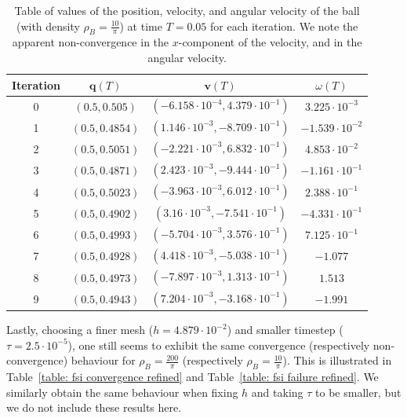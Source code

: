 \documentclass[a4paper]{amsart}
\numberwithin{equation}{section}
\theoremstyle{plain}
\newcommand{\mbf}[1]{\mathbf{#1}}
\begin{document}
\begin{table}[ht]
    \centering
    \begin{tabular}{|c|c|c|c|}
    \hline
        Iteration & $\mbf{q}(T)$ & $\mbf{v}(T)$ & $\omega(T)$\\
        \hline
        0 & $(0.5,0.505)$ &   $(-6.158\cdot 10^{-4},4.379\cdot 10^{-1})$ & $3.225\cdot 10^{-3}$\\
        \hline
        1 & $(0.5,0.4854)$ & $(1.146\cdot 10^{-3},-8.709\cdot 10^{-1})$ & $-1.539\cdot 10^{-2}$\\
        \hline
        2 & $(0.5,0.5051)$ & $(-2.221\cdot 10^{-3},6.832\cdot 10^{-1})$ & $4.853\cdot 10^{-2}$\\
        \hline
        3 & $(0.5,0.4871)$ & $(2.423\cdot 10^{-3},-9.444\cdot 10^{-1})$ & $-1.161\cdot 10^{-1}$\\
        \hline
        4 & $(0.5,0.5023)$ & $(-3.963\cdot 10^{-3},6.012\cdot 10^{-1})$ & $2.388\cdot 10^{-1}$\\
        \hline
        5 & $(0.5,0.4902)$ & $(3.16\cdot 10^{-3},-7.541\cdot 10^{-1})$ & $-4.331\cdot 10^{-1}$\\
        \hline
        6 & $(0.5,0.4993)$ & $(-5.704\cdot 10^{-3},3.576\cdot 10^{-1})$ & $7.125\cdot 10^{-1}$\\
        \hline
        7 & $(0.5,0.4928)$ & $(4.418\cdot 10^{-3},-5.038\cdot 10^{-1})$ & $-1.077$\\
        \hline
        8 & $(0.5,0.4973)$ & $(-7.897\cdot 10^{-3},1.313\cdot 10^{-1})$ & $1.513$\\
        \hline
        9 & $(0.5,0.4943)$ & $(7.204\cdot 10^{-3},-3.168\cdot 10^{-1})$ & $-1.991$\\
        \hline
    \end{tabular}
    \caption{Table of values of the position, velocity, and angular velocity of the ball (with density $\rho_B = \frac{10}{\pi}$) at time $T = 0.05$ for each iteration.
    We note the apparent non-convergence in the $x$-component of the velocity, and in the angular velocity.}
    \label{table: fsi failure}
\end{table}

Lastly, choosing a finer mesh ($h = 4.879 \cdot 10^{-2}$) and smaller timestep ($\tau = 2.5 \cdot 10^{-5}$), one still seems to exhibit the same convergence (respectively non-convergence) behaviour for $\rho_B = \frac{200}{\pi}$ (respectively $\rho_B = \frac{10}{\pi}$).
This is illustrated in Table~\ref{table: fsi convergence refined} and Table~\ref{table: fsi failure refined}.
We similarly obtain the same behaviour when fixing $h$ and taking $\tau$ to be smaller, but we do not include these results here.
\end{document}
